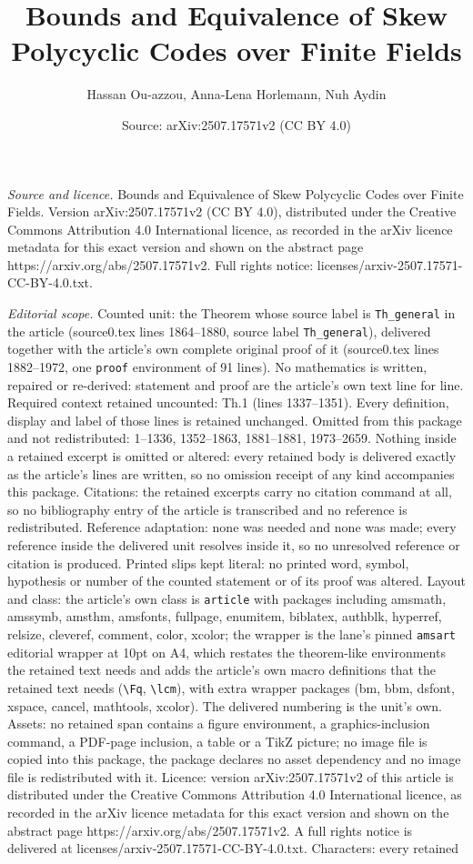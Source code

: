 \documentclass[10pt,a4paper]{amsart}
\title[Bounds and Equivalence of Skew Polycyclic Codes over Finite ]{Bounds and Equivalence of Skew Polycyclic Codes over Finite Fields}
\author{Hassan Ou-azzou, Anna-Lena Horlemann, Nuh Aydin}
\date{Source: arXiv:2507.17571v2 (CC BY 4.0)}
\begin{document}
\maketitle

\noindent\emph{Source and licence.} Bounds and Equivalence of Skew Polycyclic Codes over Finite Fields. Version arXiv:2507.17571v2 (CC BY 4.0), distributed under the Creative Commons Attribution 4.0 International licence, as recorded in the arXiv licence metadata for this exact version and shown on the abstract page https://arxiv.org/abs/2507.17571v2. Full rights notice: licenses/arxiv-2507.17571-CC-BY-4.0.txt.\par\smallskip

\noindent\textit{Editorial scope.} Counted unit: the Theorem whose source label is \texttt{Th\_general} in the article (source0.tex lines 1864--1880, source label \texttt{Th\_general}), delivered together with the article's own complete original proof of it (source0.tex lines 1882--1972, one \texttt{proof} environment of 91 lines). No mathematics is written, repaired or re-derived: statement and proof are the article's own text line for line. Required context retained uncounted: Th.1 (lines 1337--1351). Every definition, display and label of those lines is retained unchanged. Omitted from this package and not redistributed: 1--1336, 1352--1863, 1881--1881, 1973--2659. Nothing inside a retained excerpt is omitted or altered: every retained body is delivered exactly as the article's lines are written, so no omission receipt of any kind accompanies this package. Citations: the retained excerpts carry no citation command at all, so no bibliography entry of the article is transcribed and no reference is redistributed. Reference adaptation: none was needed and none was made; every reference inside the delivered unit resolves inside it, so no unresolved reference or citation is produced. Printed slips kept literal: no printed word, symbol, hypothesis or number of the counted statement or of its proof was altered. Layout and class: the article's own class is \texttt{article} with packages including amsmath, amssymb, amsthm, amsfonts, fullpage, enumitem, biblatex, authblk, hyperref, relsize, cleveref, comment, color, xcolor; the wrapper is the lane's pinned \texttt{amsart} editorial wrapper at 10pt on A4, which restates the theorem-like environments the retained text needs and adds the article's own macro definitions that the retained text needs (\texttt{\textbackslash Fq}, \texttt{\textbackslash lcm}), with extra wrapper packages (bm, bbm, dsfont, xspace, cancel, mathtools, xcolor). The delivered numbering is the unit's own. Assets: no retained span contains a figure environment, a graphics-inclusion command, a PDF-page inclusion, a table or a TikZ picture; no image file is copied into this package, the package declares no asset dependency and no image file is redistributed with it. Licence: version arXiv:2507.17571v2 of this article is distributed under the Creative Commons Attribution 4.0 International licence, as recorded in the arXiv licence metadata for this exact version and shown on the abstract page https://arxiv.org/abs/2507.17571v2. A full rights notice is delivered at licenses/arxiv-2507.17571-CC-BY-4.0.txt. Characters: every retained 
\end{document}
